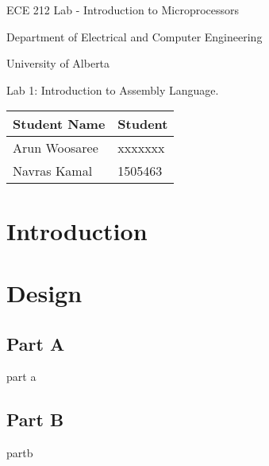 \documentclass[letterpaper]{article}
\begin{document}
  \begin{titlepage}
    \begin{center}

      \LARGE
      ECE 212 Lab - Introduction to Microprocessors

Department of Electrical and Computer Engineering

University of Alberta
\vspace{2cm}

Lab 1: Introduction to Assembly Language.
\vspace{5cm}
\Large

      \begin{tabular}{ | m{5cm} | m{5cm} | }
        \hline
        Student Name & Student \\
        \hline
        Arun Woosaree & xxxxxxx \\
        \hline
        Navras Kamal & 1505463 \\
        \hline
      \end{tabular}




    \end{center}
\end{titlepage}


\tableofcontents
\newpage

\section{Introduction}
  \lipsum[1-2]
\section{Design}

  \subsection{Part A}
    part a
    \lipsum[3]
  \subsection{Part B}
    partb
    \lipsum[4]
\end{document}
